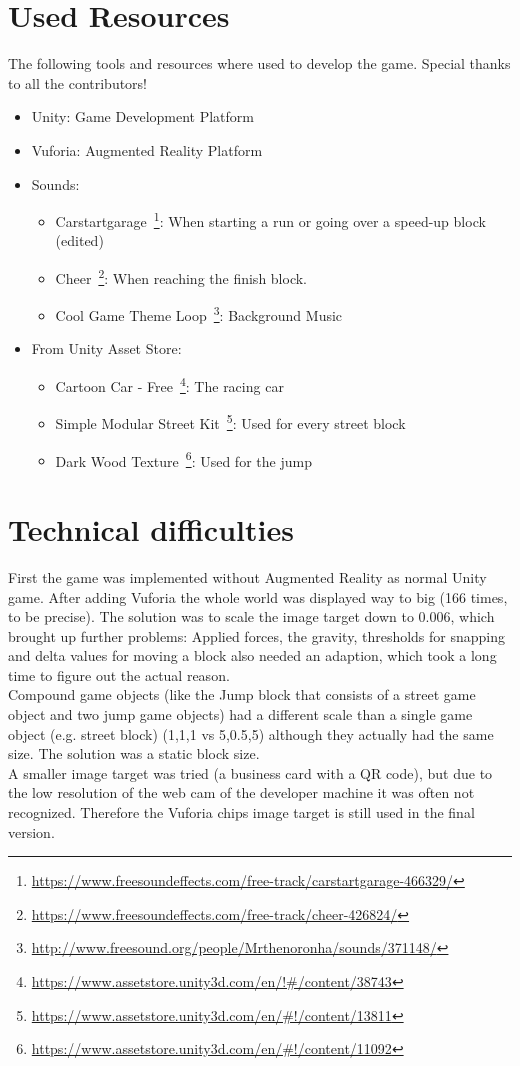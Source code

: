 \documentclass{vgtc}                          %
\begin{document}
\section{Used Resources}
The following tools and resources where used to develop the game. Special thanks to all the contributors!
\begin{itemize}
	\item Unity: Game Development Platform
	\item Vuforia: Augmented Reality Platform
	\item Sounds:
		\begin{itemize}
			\item Carstartgarage~\footnote{\url{https://www.freesoundeffects.com/free-track/carstartgarage-466329/}}: When starting a run or going over a speed-up block (edited)
			\item Cheer~\footnote{\url{https://www.freesoundeffects.com/free-track/cheer-426824/}}: When reaching the finish block.
			\item Cool Game Theme Loop~\footnote{\url{http://www.freesound.org/people/Mrthenoronha/sounds/371148/}}: Background Music
		\end{itemize}
	\item From Unity Asset Store:
		\begin{itemize}
			\item Cartoon Car - Free~\footnote{\url{https://www.assetstore.unity3d.com/en/!\#/content/38743}}: The racing car
			\item Simple Modular Street Kit~\footnote{\url{https://www.assetstore.unity3d.com/en/\#!/content/13811}}: Used for every street block
			\item Dark Wood Texture~\footnote{\url{https://www.assetstore.unity3d.com/en/\#!/content/11092}}: Used for the jump
		\end{itemize}
\end{itemize}

\section{Technical difficulties}
First the game was implemented without Augmented Reality as normal Unity game. After adding Vuforia the whole world was displayed way to big (166 times, to be precise). The solution was to scale the image target down to 0.006, which brought up further problems: Applied forces, the gravity, thresholds for snapping and delta values for moving a block also needed an adaption, which took a long time to figure out the actual reason.\\


Compound game objects (like the Jump block that consists of a street game object and two jump game objects) had a different scale than a single game object (e.g. street block) (1,1,1 vs 5,0.5,5) although they actually had the same size. The solution was a static block size. \\


A smaller image target was tried (a business card with a QR code), but due to the low resolution of the web cam of the developer machine it was often not recognized. Therefore the Vuforia chips image target is still used in the final version.
\end{document}
